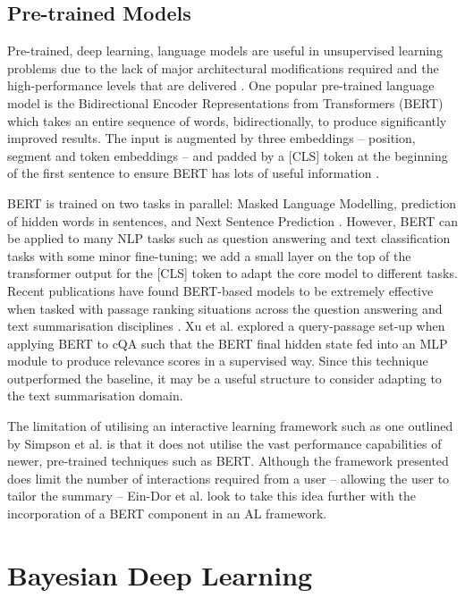 \documentclass[ %
                    author={James Stephenson},
                supervisor={Dr. Edwin Simpson},
                    degree={MSc},
                     title={Project Plan: Bayesian Deep Learning For Extractive Test Summarisation},
                  subtitle={},
                      type={},
                      year={2022}]{../additions/dissertation}
\begin{document}
			\subsection{Pre-trained Models}
			\label{chap:literaturereview:deep:pretrained}
			
			Pre-trained, deep learning, language models are useful in unsupervised learning problems due to the lack of major architectural modifications required and the high-performance levels that are delivered \cite{Mridha21}. One popular pre-trained language model is the Bidirectional Encoder Representations from Transformers (BERT) which takes an entire sequence of words, bidirectionally, to produce significantly improved results. The input is augmented by three embeddings – position, segment and token embeddings – and padded by a [CLS] token at the beginning of the first sentence to ensure BERT has lots of useful information \cite{Navin21}.
			
			\medbreak
			BERT is trained on two tasks in parallel: Masked Language Modelling, prediction of hidden words in sentences, and Next Sentence Prediction \cite{Navin21}. However, BERT can be applied to many NLP tasks \cite{Mridha21} such as question answering and text classification tasks with some minor fine-tuning; we add a small layer on the top of the transformer output for the [CLS] token \cite{Navin21} to adapt the core model to different tasks. Recent publications have found BERT-based models \cite{Devlin18} to be extremely effective when tasked with passage ranking situations across the question answering and text summarisation disciplines \cite{Xu19, Qiao19}. Xu et al. \cite{Xu19} explored a query-passage set-up when applying BERT to cQA such that the BERT final hidden state fed into an MLP module to produce relevance scores in a supervised way. Since this technique outperformed the baseline, it may be a useful structure to consider adapting to the text summarisation domain.
			
			\medbreak
			The limitation of utilising an interactive learning framework such as one outlined by Simpson et al. \cite{Simpson19} is that it does not utilise the vast performance capabilities of newer, pre-trained techniques such as BERT. Although the framework presented does limit the number of interactions required from a user – allowing the user to tailor the summary – Ein-Dor et al. \cite{EinDor20} look to take this idea further with the incorporation of a BERT component in an AL framework. 		
		
		\section{Bayesian Deep Learning}
		\label{chap:literaturereview:deepbayes}
		
\end{document}
